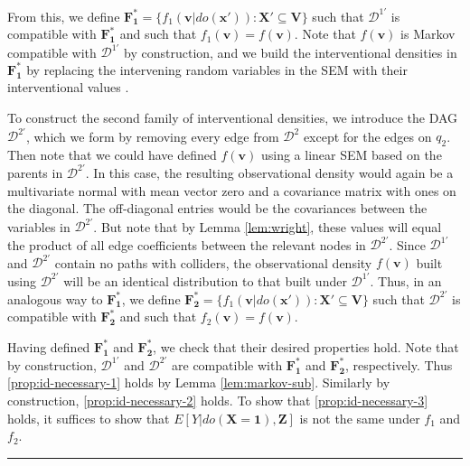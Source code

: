 \documentclass[twoside]{article}
\newcommand{\mb}[1]{\mathbf{#1}}
\newcommand{\g}[1][G]{\mathcal{#1}}
\newenvironment{proofof}[1][]{\begin{trivlist}
\item[\hskip \labelsep {\bfseries Proof of #1.}]}{\hfill\BlackBox\end{trivlist}}
\newcommand{\BlackBox}{\rule{1.5ex}{1.5ex}}
\begin{document}
\begin{proofof}[Proposition \ref{prop:id-necessary}]
    From this, we define $\mb{F^*_1} = \{ f_1(\mb{v}|do(\mb{x'})) : \mb{X'} \subseteq \mb{V} \}$ such that $\g[D]^{1'}$ is compatible with $\mb{F^*_1}$ and such that $f_1(\mb{v}) = f(\mb{v})$. Note that $f(\mb{v})$ is Markov compatible with $\g[D]^{1'}$ by construction, and we build the interventional densities in $\mb{F^*_1}$ by replacing the intervening random variables in the SEM with their interventional values \citep{pearl2009causality}.

    To construct the second family of interventional densities, we introduce the DAG $\g[D]^{2'}$, which we form by removing every edge from $\g[D]^2$ except for the edges on $q_2$. Then note that we could have defined $f(\mb{v})$ using a linear SEM based on the parents in $\g[D]^{2'}$. In this case, the resulting observational density would again be a multivariate normal with mean vector zero and a covariance matrix with ones on the diagonal. The off-diagonal entries would be the covariances between the variables in $\g[D]^{2'}$. But note that by Lemma \ref{lem:wright}, these values will equal the product of all edge coefficients between the relevant nodes in $\g[D]^{2'}$. Since $\g[D]^{1'}$ and $\g[D]^{2'}$ contain no paths with colliders, the observational density $f(\mb{v})$ built using $\g[D]^{2'}$ will be an identical distribution to that built under $\g[D]^{1'}$. Thus, in an analogous way to $\mb{F^*_1}$, we define $\mb{F^*_2} = \{ f_1(\mb{v}|do(\mb{x'})) : \mb{X'} \subseteq \mb{V} \}$ such that $\g[D]^{2'}$ is compatible with $\mb{F^*_2}$ and such that $f_2(\mb{v}) = f(\mb{v})$.
        
    Having defined $\mb{F^*_1}$ and $\mb{F^*_2}$, we check that their desired properties hold. Note that by construction, $\g[D]^{1'}$ and $\g[D]^{2'}$ are compatible with $\mb{F^*_1}$ and $\mb{F^*_2}$, respectively. Thus \ref{prop:id-necessary-1} holds by Lemma \ref{lem:markov-sub}. Similarly by construction, \ref{prop:id-necessary-2} holds. To show that \ref{prop:id-necessary-3} holds, it suffices to show that $E[Y | do(\mb{X}=\mb{1}), \mb{Z}]$ is not the same under $f_1$ and $f_2$. 


\end{proofof}
\end{document}
